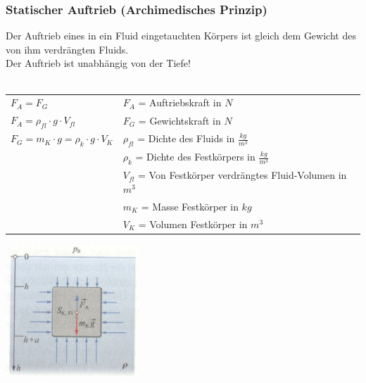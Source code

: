 	\subsubsection{Statischer Auftrieb (Archimedisches Prinzip)}
		\begin{minipage}[t]{13cm}
			Der Auftrieb eines in ein Fluid eingetauchten Körpers ist gleich dem Gewicht des von ihm verdrängten Fluids.\\
			Der Auftrieb ist unabhängig von der Tiefe!\\ \\
			\renewcommand{\arraystretch}{1.5}
			\begin{tabular}{ p{4cm} | p{7cm}}
				$F_A = F_G$	&	$F_A$ = Auftriebskraft in $N$\\
				$F_A = \rho_{fl} \cdot g \cdot V_{fl}$	& $F_G$ = Gewichtskraft in $N$\\
				$F_G = m_K \cdot g = \rho_k \cdot g \cdot V_K$	& $\rho_{fl}$ = Dichte des Fluids in $\frac{kg}{m^3}$\\
				& $\rho_{k}$ = Dichte des Festkörpers in $\frac{kg}{m^3}$\\
				& $V_{fl}$ = Von Festkörper verdrängtes Fluid-Volumen in $m^3$\\
				& $m_K$ = Masse Festkörper in $kg$\\
				& $V_K$ = Volumen Festkörper in $m^3$\\
			\end{tabular}
			\renewcommand{\arraystretch}{1}
		\end{minipage}
		\begin{minipage}[t]{10cm}
			\vspace{-\ht\strutbox}\includegraphics[width=5cm]{./bilder/StatischerAuftrieb.jpg}
		\end{minipage}
	
